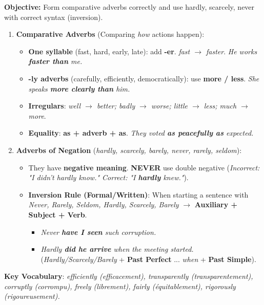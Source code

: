 \documentclass[11pt]{article}
\newcommand{\cle}[1]{{\popxbold\color{popdark}#1}}
\begin{document}
\begin{methode}
    \textbf{Objective:} Form comparative adverbs correctly and use \cle{hardly}, \cle{scarcely}, \cle{never} with correct syntax (inversion).
    \begin{enumerate}
        \item \textbf{Comparative Adverbs} (Comparing \emph{how} actions happen):
              \begin{itemize}
                  \item \textbf{One syllable} (fast, hard, early, late): add \textbf{-er}. \textit{fast $\to$ faster}. \textit{He works \textbf{faster than} me.}
                  \item \textbf{-ly adverbs} (carefully, efficiently, democratically): use \textbf{more / less}. \textit{She speaks \textbf{more clearly than} him.}
                  \item \textbf{Irregulars}: \textit{well $\to$ better; badly $\to$ worse; little $\to$ less; much $\to$ more}.
                  \item \textbf{Equality}: \textbf{as + adverb + as}. \textit{They voted \textbf{as peacefully as} expected.}
              \end{itemize}
        \item \textbf{Adverbs of Negation} (\emph{hardly, scarcely, barely, never, rarely, seldom}):
              \begin{itemize}
                  \item They have \textbf{negative meaning}. \textbf{NEVER} use double negative (\textit{Incorrect: "I didn't hardly know." Correct: "I \textbf{hardly} knew."}).
                  \item \textbf{Inversion Rule (Formal/Written)}: When starting a sentence with \emph{Never, Rarely, Seldom, Hardly, Scarcely, Barely} $\to$ \textbf{Auxiliary + Subject + Verb}.
                      \begin{itemize}
                          \item \textit{Never \textbf{have I seen} such corruption.}
                          \item \textit{Hardly \textbf{did he arrive} when the meeting started.} (\emph{Hardly/Scarcely/Barely} + \textbf{Past Perfect} ... \emph{when} + \textbf{Past Simple}).
                      \end{itemize}
              \end{itemize}
    \end{enumerate}
    \textbf{Key Vocabulary}: \textit{efficiently (efficacement), transparently (transparentement), corruptly (corrompu), freely (librement), fairly (équitablement), rigorously (rigoureusement).}
\end{methode}
\end{document}
